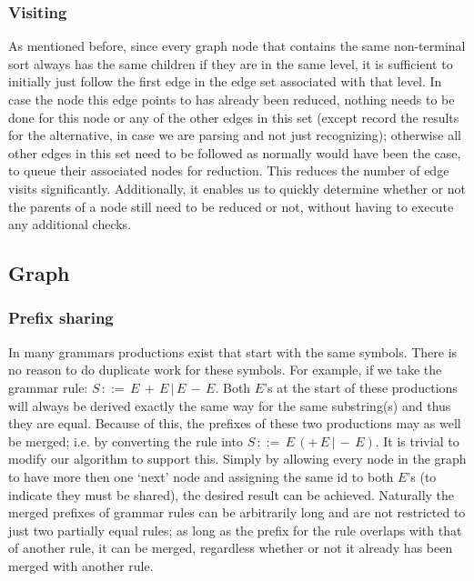 \documentclass[a4paper,10pt]{article}
\begin{document}
\subsubsection{Visiting}
\label{subsec:edgeVisitOptimization}
As mentioned before, since every graph node that contains the same non-terminal sort always has the same children if they are in the same level, it is sufficient to initially just follow the first edge in the edge set associated with that level. In case the node this edge points to has already been reduced, nothing needs to be done for this node or any of the other edges in this set (except record the results for the alternative, in case we are parsing and not just recognizing); otherwise all other edges in this set need to be followed as normally would have been the case, to queue their associated nodes for reduction. This reduces the number of edge visits significantly. Additionally, it enables us to quickly determine whether or not the parents of a node still need to be reduced or not, without having to execute any additional checks.

\subsection{Graph}

\subsubsection{Prefix sharing}
\label{sec:prefixSharing}
In many grammars productions exist that start with the same symbols. There is no reason to do duplicate work for these symbols. For example, if we take the grammar rule: $S\,::=\,E\,+\,E\,|\,E\,-\,E$. Both $E$'s at the start of these productions will always be derived exactly the same way for the same substring(s) and thus they are equal. Because of this, the prefixes of these two productions may as well be merged; i.e. by converting the rule into $S\,::=\,E\,(+\,E\,|\,-\,E)$. It is trivial to modify our algorithm to support this. Simply by allowing every node in the graph to have more then one `next' node and assigning the same id to both $E$'s (to indicate they must be shared), the desired result can be achieved. Naturally the merged prefixes of grammar rules can be arbitrarily long and are not restricted to just two partially equal rules; as long as the prefix for the rule overlaps with that of another rule, it can be merged, regardless whether or not it already has been merged with another rule.
\end{document}
